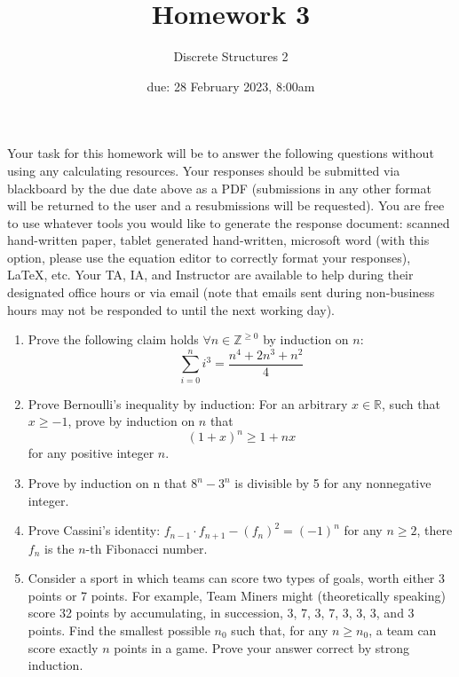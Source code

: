 \documentclass[11pt, oneside]{article}   	%
\title{Homework 3}
\author{Discrete Structures 2}
\date{due: 28 February 2023, 8:00am}							%
\newcommand{\reals}{\mathbb{R}}
\newcommand{\ints}{\mathbb{Z}}
\begin{document}
\maketitle

Your task for this homework will be to answer the following questions without using any calculating resources. 
Your responses should be submitted via blackboard by the due date above as a PDF (submissions in any other format will be returned to the user and a resubmissions will be requested). 
You are free to use whatever tools you would like to generate the response document: 
scanned hand-written paper, 
tablet generated hand-written, 
microsoft word (with this option, please use the equation editor to correctly format your responses), 
\LaTeX, etc.
Your TA, IA, and Instructor are available to help during their designated office hours or via email 
(note that emails sent during non-business hours may not be responded to until the next working day). 

\begin{enumerate}
\item Prove the following claim holds $\forall n \in \ints^{\ge0}$ by induction on $n$:
\[
\sum_{i=0}^n i^3 = \frac{n^4 + 2n^3 + n^2}{4}
\]

\item Prove Bernoulli’s inequality by induction:  For an arbitrary $x\in\reals$, such that $x\ge-1$, 
prove by induction on $n$ that
\[
(1+x)^n \ge1+nx
\]
for any positive integer $n$.

\item Prove by induction on n that $8^n - 3^n$ is divisible by 5 for any nonnegative integer.

\item Prove Cassini’s identity: $f_{n-1} \cdot f_{n+1} - (f_n)^2 = (-1)^n$ for any $n\ge2$, there $f_n$ is the $n$-th Fibonacci number. 

\clearpage
\item Consider a sport in which teams can score two types of goals, 
worth either 3 points or 7 points.
For example, Team Miners might (theoretically speaking) score 32 points by accumulating, in succession, 3, 7, 3, 7, 3, 3, 3, and 3 points. 
Find the smallest possible $n_0$ such that, for any $n\ge n_0$, a team can score exactly $n$ points in a game. 
Prove your answer correct by strong induction.
\end{enumerate}
\end{document}
